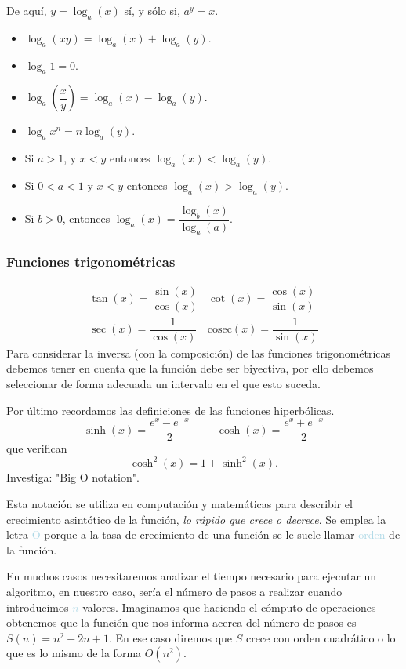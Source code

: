 \documentclass[12pt]{article}
\begin{document}
De aquí,  $y=\log_a(x)$ sí, y sólo si, $a^y=x$.
\begin{itemize}
	\item $\log_a(xy)=\log_a(x)+\log_a(y)$.
	\item $\log_a1=0$.
	\item $\log_a\left(\dfrac{x}{y}\right)=\log_a(x)-\log_a(y)$.
	\item $\log_a x^n=n\log_a(y)$.
	\item Si $a>1$, y $x<y$ entonces $\log_a(x)<\log_a(y)$.
	\item Si $0<a<1$ y $x<y$ entonces $\log_a(x)>\log_a(y)$.
	\item Si $b>0$, entonces $\log_a(x)=\dfrac{\log_b(x)}{\log_a(a)}$.
\end{itemize}
\subsubsection{Funciones trigonométricas}
\[ \begin{array}{lr}
	\tan(x)=\dfrac{\sin(x)}{\cos(x)} & \cot(x)=\dfrac{\cos(x)}{\sin(x)}\\
	\sec(x)=\dfrac{1}{\cos(x)} & \mathrm{cosec}(x)=\dfrac{1}{\sin(x)}
\end{array} \]
Para considerar la inversa (con la composición) de las funciones trigonométricas debemos tener en cuenta que la función debe ser biyectiva, por ello debemos seleccionar de forma adecuada un intervalo en el que esto suceda.

Por último recordamos las definiciones de las funciones hiperbólicas. \[ \sinh(x)=\dfrac{e^x-e^{-x}}{2}\hspace{1cm}\cosh(x)=\dfrac{e^x+e^{-x}}{2} \] que verifican \[ \cosh^2(x)=1+\sinh^2(x) .\]
Investiga: "Big O notation".

Esta notación se utiliza en computación y matemáticas para describir el crecimiento asintótico de la función, \textit{lo rápido que crece o decrece}. Se emplea la letra \textcolor{lightblue}{O} porque a la tasa de crecimiento de una función se le suele llamar \textcolor{lightblue}{orden} de la función.

En muchos casos necesitaremos analizar el tiempo necesario para ejecutar un algoritmo, en nuestro caso, sería el número de pasos a realizar cuando introducimos \textcolor{lightblue}{$n$} valores. Imaginamos que haciendo el cómputo de operaciones obtenemos que la función que nos informa acerca del número de pasos es $S(n)=n^2+2n+1$. En ese caso diremos que $S$ crece con orden cuadrático o lo que es lo mismo de la forma $O(n^2)$.
\end{document}
